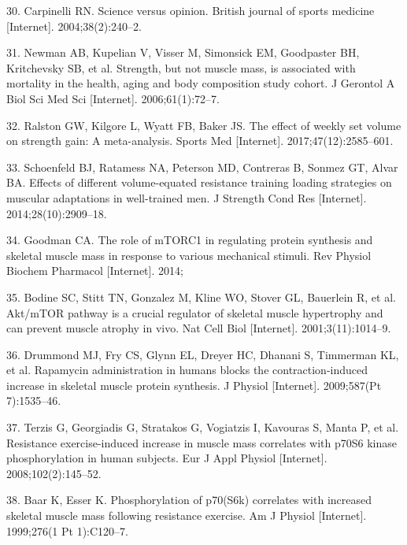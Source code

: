 \documentclass[twoside,10pt]{gihclass} %
\begin{document}
\leavevmode\hypertarget{ref-RN2201}{}%
30. Carpinelli RN. Science versus opinion. British journal of sports medicine {[}Internet{]}. 2004;38(2):240--2.

\leavevmode\hypertarget{ref-RN2523}{}%
31. Newman AB, Kupelian V, Visser M, Simonsick EM, Goodpaster BH, Kritchevsky SB, et al. Strength, but not muscle mass, is associated with mortality in the health, aging and body composition study cohort. J Gerontol A Biol Sci Med Sci {[}Internet{]}. 2006;61(1):72--7.

\leavevmode\hypertarget{ref-RN2492}{}%
32. Ralston GW, Kilgore L, Wyatt FB, Baker JS. The effect of weekly set volume on strength gain: A meta-analysis. Sports Med {[}Internet{]}. 2017;47(12):2585--601.

\leavevmode\hypertarget{ref-RN1612}{}%
33. Schoenfeld BJ, Ratamess NA, Peterson MD, Contreras B, Sonmez GT, Alvar BA. Effects of different volume-equated resistance training loading strategies on muscular adaptations in well-trained men. J Strength Cond Res {[}Internet{]}. 2014;28(10):2909--18.

\leavevmode\hypertarget{ref-RN1049}{}%
34. Goodman CA. The role of mTORC1 in regulating protein synthesis and skeletal muscle mass in response to various mechanical stimuli. Rev Physiol Biochem Pharmacol {[}Internet{]}. 2014;

\leavevmode\hypertarget{ref-RN782}{}%
35. Bodine SC, Stitt TN, Gonzalez M, Kline WO, Stover GL, Bauerlein R, et al. Akt/mTOR pathway is a crucial regulator of skeletal muscle hypertrophy and can prevent muscle atrophy in vivo. Nat Cell Biol {[}Internet{]}. 2001;3(11):1014--9.

\leavevmode\hypertarget{ref-RN780}{}%
36. Drummond MJ, Fry CS, Glynn EL, Dreyer HC, Dhanani S, Timmerman KL, et al. Rapamycin administration in humans blocks the contraction-induced increase in skeletal muscle protein synthesis. J Physiol {[}Internet{]}. 2009;587(Pt 7):1535--46.

\leavevmode\hypertarget{ref-RN785}{}%
37. Terzis G, Georgiadis G, Stratakos G, Vogiatzis I, Kavouras S, Manta P, et al. Resistance exercise-induced increase in muscle mass correlates with p70S6 kinase phosphorylation in human subjects. Eur J Appl Physiol {[}Internet{]}. 2008;102(2):145--52.

\leavevmode\hypertarget{ref-RN866}{}%
38. Baar K, Esser K. Phosphorylation of p70(S6k) correlates with increased skeletal muscle mass following resistance exercise. Am J Physiol {[}Internet{]}. 1999;276(1 Pt 1):C120--7.
\end{document}
